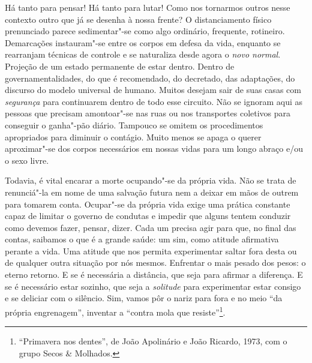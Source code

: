 Há tanto para pensar! Há tanto para lutar! Como nos tornarmos outros
nesse contexto outro que já se desenha à nossa frente? O distanciamento
físico prenunciado parece sedimentar"-se como algo ordinário, frequente,
rotineiro. Demarcações instauram"-se entre os corpos em defesa da vida,
enquanto se rearranjam técnicas de controle e se naturaliza desde agora
o \emph{novo normal}. Projeção de um estado permanente de estar dentro.
Dentro de governamentalidades, do que é recomendado, do decretado, das
adaptações, do discurso do modelo universal de humano. Muitos desejam
sair de suas casas com \emph{segurança} para continuarem dentro de todo
esse circuito. Não se ignoram aqui as pessoas que precisam amontoar"-se
nas ruas ou nos transportes coletivos para conseguir o ganha"-pão diário.
Tampouco se omitem os procedimentos apropriados para diminuir o
contágio. Muito menos se apaga o querer aproximar"-se dos corpos
necessários em nossas vidas para um longo abraço e/ou o sexo livre.

Todavia, é vital encarar a morte ocupando"-se da própria vida. Não se
trata de renunciá"-la em nome de uma salvação futura nem a deixar em mãos
de outrem para tomarem conta. Ocupar"-se da própria vida exige uma
prática constante capaz de limitar o governo de condutas e impedir que
alguns tentem conduzir como devemos fazer, pensar, dizer. Cada um
precisa agir para que, no final das contas, saibamos o que é a grande
saúde: um sim, como atitude afirmativa perante a vida. Uma atitude que
nos permita experimentar saltar fora desta ou de qualquer outra situação
por nós mesmos. Enfrentar o mais pesado dos pesos: o eterno retorno. E
se é necessária a distância, que seja para afirmar a diferença. E se é
necessário estar sozinho, que seja a \emph{solitude} para experimentar
estar consigo e se deliciar com o silêncio. Sim, vamos pôr o nariz para
fora e no meio ``da própria engrenagem'', inventar a ``contra mola que
resiste''\footnote{``Primavera nos dentes'', de João Apolinário e João
  Ricardo, 1973, com o grupo Secos \& Molhados.}.


